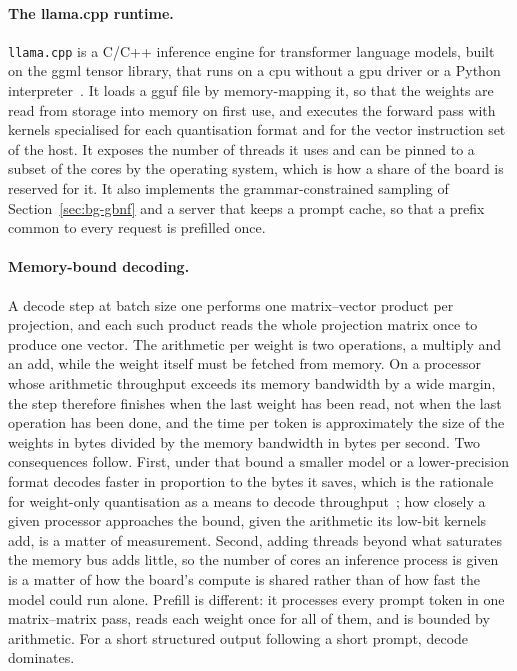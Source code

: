 \paragraph{The llama.cpp runtime.} \texttt{llama.cpp} is a C/C++ inference engine for
transformer language models, built on the \gls{ggml} tensor library, that runs on a \gls{cpu}
without a \gls{gpu} driver or a Python interpreter~\cite{llamacpp}. It loads a \gls{gguf} file by
memory-mapping it, so that the weights are read from storage into memory on first use, and
executes the forward pass with kernels specialised for each quantisation format and for the
vector instruction set of the host. It exposes the number of threads it uses and can be pinned to
a subset of the cores by the operating system, which is how a share of the board is reserved for
it. It also implements the grammar-constrained sampling of Section~\ref{sec:bg-gbnf} and a server
that keeps a prompt cache, so that a prefix common to every request is prefilled once.

\paragraph{Memory-bound decoding.} A decode step at batch size one performs one
matrix--vector product per projection, and each such product reads the whole projection matrix
once to produce one vector. The arithmetic per weight is two operations, a multiply and an add,
while the weight itself must be fetched from memory. On a processor whose arithmetic throughput
exceeds its memory bandwidth by a wide margin, the step therefore finishes when the last weight
has been read, not when the last operation has been done, and the time per token is approximately
the size of the weights in bytes divided by the memory bandwidth in bytes per second. Two
consequences follow. First, under that bound a smaller model or a lower-precision format decodes
faster in proportion to the bytes it saves, which is the rationale for weight-only quantisation as
a means to decode throughput~\cite{awq}; how closely a given processor approaches the bound, given
the arithmetic its low-bit kernels add, is a matter of measurement. Second, adding threads beyond
what saturates the memory bus adds little, so the number of cores an inference process is given is a matter of how the board's
compute is shared rather than of how fast the model could run alone. Prefill is different: it
processes every prompt token in one matrix--matrix pass, reads each weight once for all of them,
and is bounded by arithmetic. For a short structured output following a short prompt, decode
dominates.

